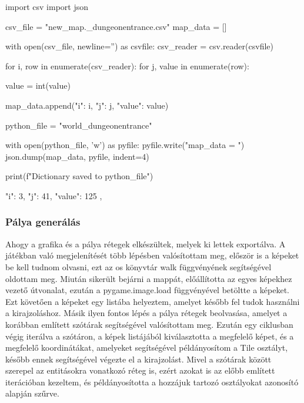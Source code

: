 \begin{python}[caption={CSV formátum dictionary formátumra konvertálása \cite{csv-to-dict}},label=py:csvtodict]
    import csv
    import json
    
    csv_file = "new_map\MSmap._dungeonentrance.csv"
    map_data = []
    
    with open(csv_file, newline='') as csvfile:
        csv_reader = csv.reader(csvfile)
    
        for i, row in enumerate(csv_reader):
            for j, value in enumerate(row):
    
                value = int(value)
    
                    map_data.append({"i": i, "j": j, "value": value})
    
    python_file = "world_dungeonentrance"
    
    with open(python_file, 'w') as pyfile:
        pyfile.write("map_data = ")
        json.dump(map_data, pyfile, indent=4)
    
    print(f"Dictionary saved to {python_file}")
    
\end{python}


\begin{python}[caption={Minta az átalakított struktúrára \cite{dict-structure}
    }, label=py:átalakított struktúra]
    {
        "i": 3,
        "j": 41,
        "value": 125
    },
\end{python}

\subsubsection{Pálya generálás}

\indent \indent Ahogy a grafika és a pálya rétegek elkészültek, melyek ki lettek exportálva. A játékban való megjelenítését több lépésben valósítottam meg, először is a képeket be kell tudnom olvasni, ezt az os könyvtár walk függvényének segítségével oldottam meg. Miután sikerült bejárni a mappát, előállította az egyes képekhez vezető útvonalat, ezután a pygame.image.load függvényével betöltte a képeket. Ezt követően a képeket egy listába helyeztem, amelyet később fel tudok használni a kirajzoláshoz. Másik ilyen fontos lépés a pálya rétegek beolvasása, amelyet a korábban említett szótárak segítségével valósítottam meg. Ezután egy ciklusban végig iterálva a szótáron, a képek listájából kiválasztotta a megfelelő képet, és a megfelelő koordinátákat, amelyeket segítségével példányosítom a Tile osztályt, később ennek segítségével végezte el a kirajzolást. Mivel a szótárak között szerepel az entitásokra vonatkozó réteg is, ezért azokat is az előbb említett iterációban kezeltem, és példányosította a hozzájuk tartozó osztályokat azonosító alapján szűrve.

